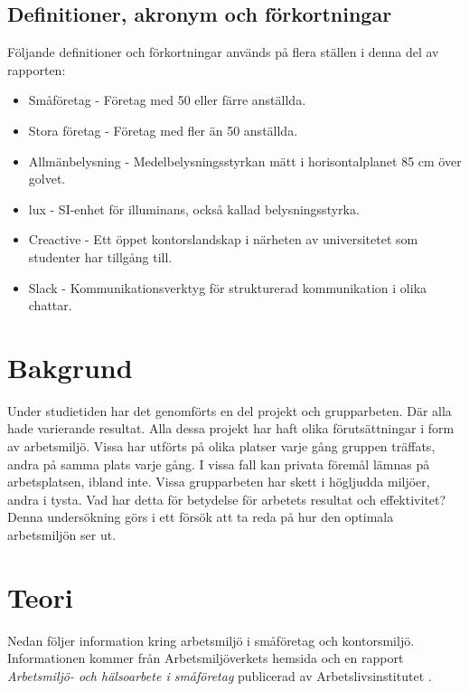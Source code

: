 \subsection{Definitioner, akronym och förkortningar}
Följande definitioner och förkortningar används på flera ställen i denna del av rapporten:

\begin{itemize}
\item Småföretag - Företag med 50 eller färre anställda.
\item Stora företag - Företag med fler än 50 anställda.
\item Allmänbelysning - Medelbelysningsstyrkan mätt i horisontalplanet 85 cm över golvet.
\item lux - SI-enhet för illuminans, också kallad belysningsstyrka.
\item Creactive - Ett öppet kontorslandskap i närheten av universitetet som studenter har tillgång till.
\item Slack - Kommunikationsverktyg för strukturerad kommunikation i olika chattar. 
\end{itemize}

\section{Bakgrund}
\label{sec:background-hampus}

Under studietiden har det genomförts en del projekt och grupparbeten. Där alla hade varierande resultat. Alla dessa projekt har haft olika förutsättningar i form av arbetsmiljö. Vissa har utförts på olika platser varje gång gruppen träffats, andra på samma plats varje gång. I vissa fall kan privata föremål lämnas på arbetsplatsen, ibland inte. Vissa grupparbeten har skett i högljudda miljöer, andra i tysta. Vad har detta för betydelse för arbetets resultat och effektivitet? Denna undersökning görs i ett försök att ta reda på hur den optimala arbetsmiljön ser ut. 

\section{Teori}
\label{sec:theory-hampus}
Nedan följer information kring arbetsmiljö i småföretag och kontorsmiljö. Informationen kommer från Arbetsmiljöverkets hemsida och en rapport \textit{Arbetsmiljö- och hälsoarbete i småföretag} publicerad av Arbetslivsinstitutet \cite{AV}\cite{smaforetag}.

